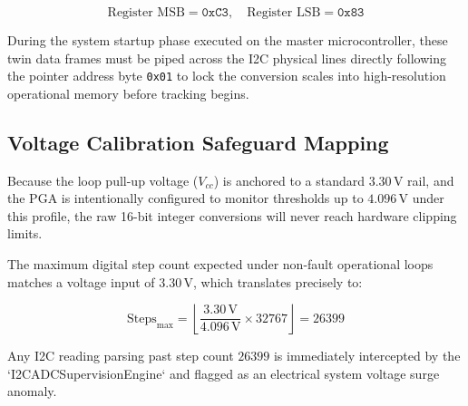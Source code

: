 \begin{equation}
    \text{Register MSB} = \texttt{0xC3}, \quad \text{Register LSB} = \texttt{0x83}
\end{equation}

During the system startup phase executed on the master microcontroller, these twin data frames must be piped across the I2C physical lines directly following the pointer address byte \texttt{0x01} to lock the conversion scales into high-resolution operational memory before tracking begins.

\subsection{Voltage Calibration Safeguard Mapping}
Because the loop pull-up voltage ($V_{cc}$) is anchored to a standard $3.30\,\text{V}$ rail, and the PGA is intentionally configured to monitor thresholds up to $4.096\,\text{V}$ under this profile, the raw 16-bit integer conversions will never reach hardware clipping limits. 

The maximum digital step count expected under non-fault operational loops matches a voltage input of $3.30\,\text{V}$, which translates precisely to:

\begin{equation}
    \text{Steps}_{\text{max}} = \left\lfloor \frac{3.30\,\text{V}}{4.096\,\text{V}} \times 32767 \right\rfloor = 26399
\end{equation}

Any I2C reading parsing past step count $26399$ is immediately intercepted by the `I2CADCSupervisionEngine` and flagged as an electrical system voltage surge anomaly.



